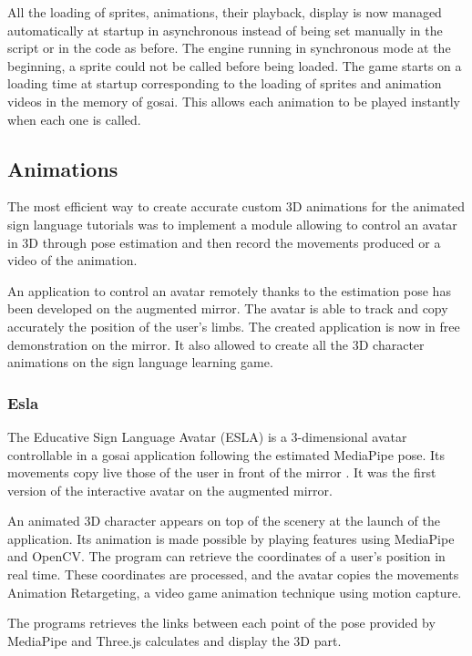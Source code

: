 All the loading of sprites, animations, their playback, display is now managed automatically at startup in asynchronous instead of being set manually in the script or in the code as before. The engine running in synchronous mode at the beginning, a sprite could not be called before being loaded. The game starts on a loading time at startup corresponding to the loading of sprites and animation videos in the memory of gosai. This allows each animation to be played instantly when each one is called.

\subsection{Animations}

The most efficient way to create accurate custom 3D animations for the animated sign language tutorials was to implement a module allowing to control an avatar in 3D through pose estimation and then record the movements produced or a video of the animation.

An application to control an avatar remotely thanks to the estimation pose has been developed on the augmented mirror. The avatar is able to track and copy accurately the position of the user's limbs. The created application is now in free demonstration on the mirror. It also allowed to create all the 3D character animations on the sign language learning game.

\subsubsection{Esla}

The Educative Sign Language Avatar (ESLA) is a 3-dimensional avatar controllable in a gosai application following the estimated MediaPipe pose. Its movements copy live those of the user in front of the mirror \cite{esla}. It was the first version of the interactive avatar on the augmented mirror.

An animated 3D character appears on top of the scenery at the launch of the application. Its animation is made possible by playing features using MediaPipe and OpenCV. The program can retrieve the coordinates of a user’s position in real time. These coordinates are processed, and the avatar copies the movements Animation Retargeting, a video game animation technique using motion capture.

The programs retrieves the links between each point of the pose provided by MediaPipe and Three.js calculates and display the 3D part. 

